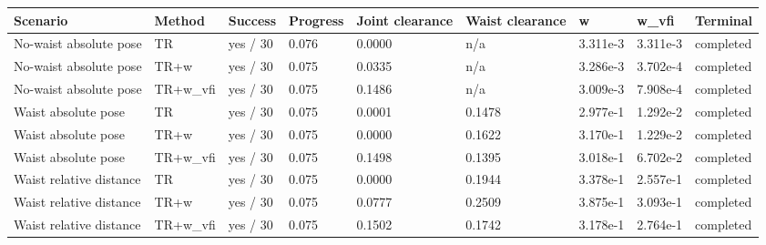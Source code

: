 \begin{tabular}{lllllllll}
\toprule
Scenario & Method & Success & Progress & Joint clearance & Waist clearance & w & w\_vfi & Terminal \\
\midrule
No-waist absolute pose & TR & yes / 30 & 0.076 & 0.0000 & n/a & 3.311e-3 & 3.311e-3 & completed \\
No-waist absolute pose & TR+w & yes / 30 & 0.075 & 0.0335 & n/a & 3.286e-3 & 3.702e-4 & completed \\
No-waist absolute pose & TR+w\_vfi & yes / 30 & 0.075 & 0.1486 & n/a & 3.009e-3 & 7.908e-4 & completed \\
Waist absolute pose & TR & yes / 30 & 0.075 & 0.0001 & 0.1478 & 2.977e-1 & 1.292e-2 & completed \\
Waist absolute pose & TR+w & yes / 30 & 0.075 & 0.0000 & 0.1622 & 3.170e-1 & 1.229e-2 & completed \\
Waist absolute pose & TR+w\_vfi & yes / 30 & 0.075 & 0.1498 & 0.1395 & 3.018e-1 & 6.702e-2 & completed \\
Waist relative distance & TR & yes / 30 & 0.075 & 0.0000 & 0.1944 & 3.378e-1 & 2.557e-1 & completed \\
Waist relative distance & TR+w & yes / 30 & 0.075 & 0.0777 & 0.2509 & 3.875e-1 & 3.093e-1 & completed \\
Waist relative distance & TR+w\_vfi & yes / 30 & 0.075 & 0.1502 & 0.1742 & 3.178e-1 & 2.764e-1 & completed \\
\bottomrule
\end{tabular}
